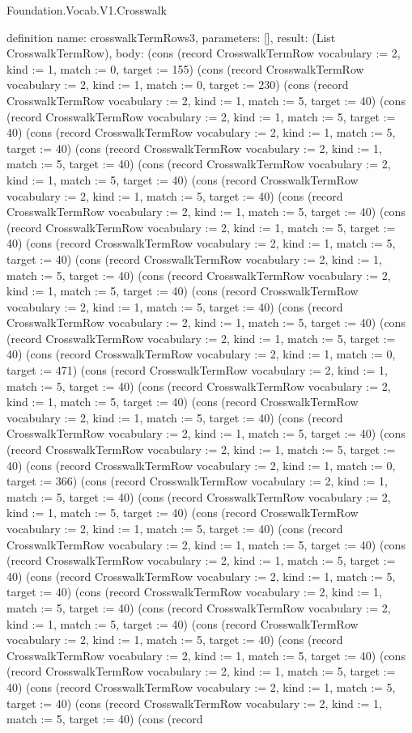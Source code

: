 \begin{lexlean}{Foundation.Vocab.V1.Crosswalk}
\begin{semanticmodule}
definition{
  name: crosswalkTermRows3,
  parameters: [],
  result: (List CrosswalkTermRow),
  body: (cons (record CrosswalkTermRow {vocabulary := 2, kind := 1, match := 0, target := 155}) (cons (record CrosswalkTermRow {vocabulary := 2, kind := 1, match := 0, target := 230}) (cons (record CrosswalkTermRow {vocabulary := 2, kind := 1, match := 5, target := 40}) (cons (record CrosswalkTermRow {vocabulary := 2, kind := 1, match := 5, target := 40}) (cons (record CrosswalkTermRow {vocabulary := 2, kind := 1, match := 5, target := 40}) (cons (record CrosswalkTermRow {vocabulary := 2, kind := 1, match := 5, target := 40}) (cons (record CrosswalkTermRow {vocabulary := 2, kind := 1, match := 5, target := 40}) (cons (record CrosswalkTermRow {vocabulary := 2, kind := 1, match := 5, target := 40}) (cons (record CrosswalkTermRow {vocabulary := 2, kind := 1, match := 5, target := 40}) (cons (record CrosswalkTermRow {vocabulary := 2, kind := 1, match := 5, target := 40}) (cons (record CrosswalkTermRow {vocabulary := 2, kind := 1, match := 5, target := 40}) (cons (record CrosswalkTermRow {vocabulary := 2, kind := 1, match := 5, target := 40}) (cons (record CrosswalkTermRow {vocabulary := 2, kind := 1, match := 5, target := 40}) (cons (record CrosswalkTermRow {vocabulary := 2, kind := 1, match := 5, target := 40}) (cons (record CrosswalkTermRow {vocabulary := 2, kind := 1, match := 5, target := 40}) (cons (record CrosswalkTermRow {vocabulary := 2, kind := 1, match := 5, target := 40}) (cons (record CrosswalkTermRow {vocabulary := 2, kind := 1, match := 0, target := 471}) (cons (record CrosswalkTermRow {vocabulary := 2, kind := 1, match := 5, target := 40}) (cons (record CrosswalkTermRow {vocabulary := 2, kind := 1, match := 5, target := 40}) (cons (record CrosswalkTermRow {vocabulary := 2, kind := 1, match := 5, target := 40}) (cons (record CrosswalkTermRow {vocabulary := 2, kind := 1, match := 5, target := 40}) (cons (record CrosswalkTermRow {vocabulary := 2, kind := 1, match := 5, target := 40}) (cons (record CrosswalkTermRow {vocabulary := 2, kind := 1, match := 0, target := 366}) (cons (record CrosswalkTermRow {vocabulary := 2, kind := 1, match := 5, target := 40}) (cons (record CrosswalkTermRow {vocabulary := 2, kind := 1, match := 5, target := 40}) (cons (record CrosswalkTermRow {vocabulary := 2, kind := 1, match := 5, target := 40}) (cons (record CrosswalkTermRow {vocabulary := 2, kind := 1, match := 5, target := 40}) (cons (record CrosswalkTermRow {vocabulary := 2, kind := 1, match := 5, target := 40}) (cons (record CrosswalkTermRow {vocabulary := 2, kind := 1, match := 5, target := 40}) (cons (record CrosswalkTermRow {vocabulary := 2, kind := 1, match := 5, target := 40}) (cons (record CrosswalkTermRow {vocabulary := 2, kind := 1, match := 5, target := 40}) (cons (record CrosswalkTermRow {vocabulary := 2, kind := 1, match := 5, target := 40}) (cons (record CrosswalkTermRow {vocabulary := 2, kind := 1, match := 5, target := 40}) (cons (record CrosswalkTermRow {vocabulary := 2, kind := 1, match := 5, target := 40}) (cons (record CrosswalkTermRow {vocabulary := 2, kind := 1, match := 5, target := 40}) (cons (record CrosswalkTermRow {vocabulary := 2, kind := 1, match := 5, target := 40}) (cons (record }
\end{semanticmodule}
\end{lexlean}
